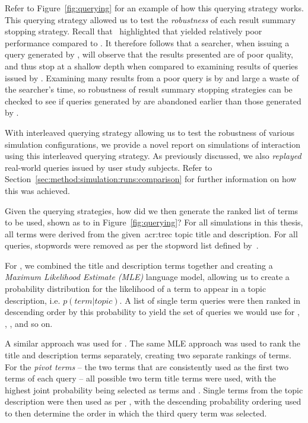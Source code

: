Refer to Figure~\ref{fig:querying} for an example of how this querying strategy works. This querying strategy allowed us to test the \emph{robustness} of each result summary stopping strategy. Recall that~\cite{keskustalo2009querying} highlighted that  yielded relatively poor performance compared to . It therefore follows that a searcher, when issuing a query generated by , will observe that the results presented are of poor quality, and thus stop at a shallow depth when compared to examining results of queries issued by . Examining many results from a poor query is by and large a waste of the searcher's time, so robustness of result summary stopping strategies can be checked to see if queries generated by  are abandoned earlier than those generated by .

With interleaved querying strategy  allowing us to test the robustness of various simulation configurations, we provide a novel report on simulations of interaction using this interleaved querying strategy. As previously discussed, we also \emph{replayed} real-world queries issued by user study subjects. Refer to Section~\ref{sec:method:simulation:runs:comparison} for further information on how this was achieved.

Given the querying strategies, how did we then generate the ranked list of terms to be used, shown as  to  in Figure~\ref{fig:querying}? For all simulations in this thesis, all terms were derived from the given~\gls{acr:trec} topic title and description. For all queries, stopwords were removed as per the stopword list defined by~\cite{fox1992stopwords}.

For , we combined the title and description terms together and creating a \emph{Maximum Likelihood Estimate (MLE)} language model, allowing us to create a probability distribution for the likelihood of a term to appear in a topic description, i.e. $p(term|topic)$. A list of single term queries were then ranked in descending order by this probability to yield the set of queries we would use for , , , and so on.

A similar approach was used for . The same MLE approach was used to rank the title and description terms separately, creating two separate rankings of terms. For the \emph{pivot terms} -- the two terms that are consistently used as the first two terms of each  query -- all possible two term title terms were used, with the highest joint probability being selected as terms  and . Single terms from the topic description were then used as per , with the descending probability ordering used to then determine the order in which the third query term was selected.

